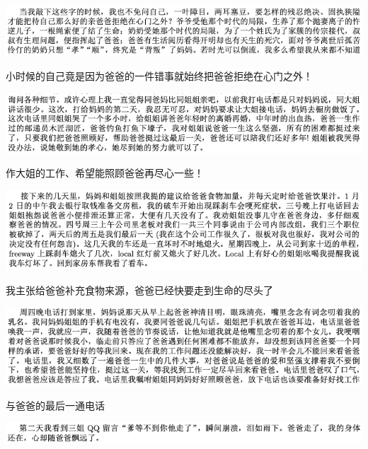 \documentclass[9pt, b5paper]{article}
\begin{document}
\begin{center}
\includegraphics[width=.9\linewidth]{./pic/backups_plans_20210417_103433.png}
\end{center}

小时候的自己竟是因为爸爸的一件错事就始终把爸爸拒绝在心门之外！

\begin{center}
\includegraphics[width=.9\linewidth]{./pic/backups_plans_20210416_163811.png}
\end{center}

作大姐的工作、希望能照顾爸爸再尽心一些！

\begin{center}
\includegraphics[width=.9\linewidth]{./pic/backups_plans_20210416_164133.png}
\end{center}

我主张给爸爸补充食物来源，爸爸已经快要走到生命的尽头了

\begin{center}
\includegraphics[width=.9\linewidth]{./pic/backups_plans_20210415_092537.png}
\end{center}

与爸爸的最后一通电话

\begin{center}
\includegraphics[width=.9\linewidth]{./pic/backups_plans_20210415_092647.png}
\end{center}
\end{document}
